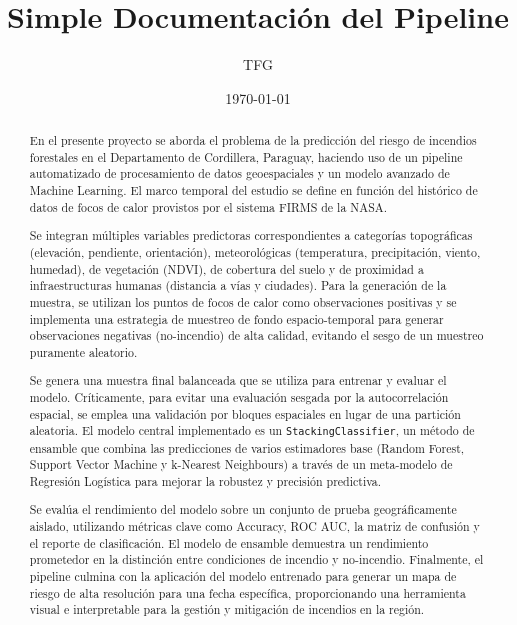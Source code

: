 \documentclass[a4paper,10pt]{article}
\title{Simple Documentación del Pipeline}
\author[1]{TFG}
\affil[1]{FPUNA}
\date{\today}
\begin{document}
\maketitle

\begin{abstract}
En el presente proyecto se aborda el problema de la predicción del riesgo de incendios forestales en el Departamento de Cordillera, Paraguay, haciendo uso de un pipeline automatizado de procesamiento de datos geoespaciales y un modelo avanzado de Machine Learning. El marco temporal del estudio se define en función del histórico de datos de focos de calor provistos por el sistema FIRMS de la NASA.

Se integran múltiples variables predictoras correspondientes a categorías topográficas (elevación, pendiente, orientación), meteorológicas (temperatura, precipitación, viento, humedad), de vegetación (NDVI), de cobertura del suelo y de proximidad a infraestructuras humanas (distancia a vías y ciudades). Para la generación de la muestra, se utilizan los puntos de focos de calor como observaciones positivas y se implementa una estrategia de muestreo de fondo espacio-temporal para generar observaciones negativas (no-incendio) de alta calidad, evitando el sesgo de un muestreo puramente aleatorio.

Se genera una muestra final balanceada que se utiliza para entrenar y evaluar el modelo. Críticamente, para evitar una evaluación sesgada por la autocorrelación espacial, se emplea una validación por bloques espaciales en lugar de una partición aleatoria. El modelo central implementado es un \texttt{StackingClassifier}, un método de ensamble que combina las predicciones de varios estimadores base (Random Forest, Support Vector Machine y k-Nearest Neighbours) a través de un meta-modelo de Regresión Logística para mejorar la robustez y precisión predictiva.

Se evalúa el rendimiento del modelo sobre un conjunto de prueba geográficamente aislado, utilizando métricas clave como Accuracy, ROC AUC, la matriz de confusión y el reporte de clasificación. El modelo de ensamble demuestra un rendimiento prometedor en la distinción entre condiciones de incendio y no-incendio. Finalmente, el pipeline culmina con la aplicación del modelo entrenado para generar un mapa de riesgo de alta resolución para una fecha específica, proporcionando una herramienta visual e interpretable para la gestión y mitigación de incendios en la región.
\end{abstract}
\end{document}
